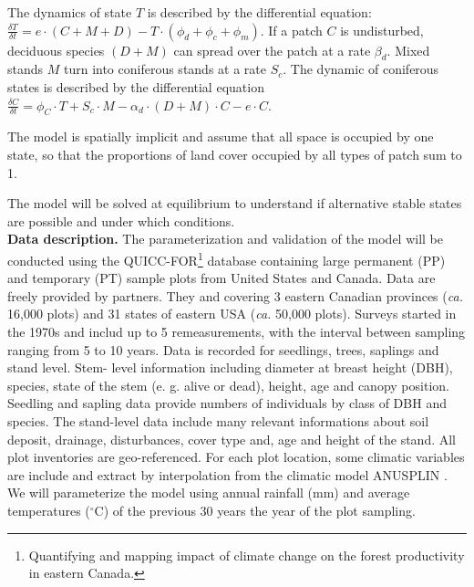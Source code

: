 The dynamics of state $T$ is described by the differential equation:
$\frac{\delta T}{\delta t} = e \cdot (C+M+D) - T \cdot (\phi_d + \phi_c +
\phi_m)$. If a patch $C$ is undisturbed, deciduous species $(D+M)$ can spread
over the patch at a rate $\beta_d$. Mixed stands $M$ turn into coniferous
stands at a rate $S_c$.  The dynamic of coniferous states is described by the
differential equation $\frac{\delta C}{\delta t} = \phi_C \cdot T + S_c \cdot
M - \alpha_d \cdot (D+M)\cdot C - e \cdot C$. 


The model is spatially implicit and assume that all space is occupied by one
state, so that the proportions of land cover occupied by all types of patch
sum to 1. 


The model will be solved at equilibrium to understand if alternative
stable states are possible and under which conditions.\\


\textbf{Data description.} The parameterization and validation of the model
will be conducted using the QUICC-FOR\footnote{Quantifying and mapping impact
of climate change on the forest productivity in eastern Canada.} database
containing large permanent (PP) and temporary (PT) sample plots from
United States and Canada. Data are freely provided by partners. They and
covering 3 eastern Canadian provinces (\textit{ca.} 16,000 plots) and 31 states of
eastern USA (\textit{ca.} 50,000 plots). Surveys started in the 1970s and includ up to
5 remeasurements, with the interval between sampling ranging from 5 to 10
years. Data is recorded for seedlings, trees, saplings and stand level. Stem-
level information including diameter at breast height (DBH), species, state of
the stem (e. g. alive or dead), height, age and canopy position. Seedling and
sapling data provide numbers of individuals by class of DBH and species. The
stand-level data include many relevant informations about soil deposit,
drainage, disturbances, cover type and, age and height of the stand. All plot
inventories are geo-referenced. For each plot location, some climatic
variables are include and extract by interpolation from the climatic model
ANUSPLIN \cite{McKenney2011}. We will parameterize the model using annual
rainfall (mm) and average temperatures (\ensuremath{^\circ}C) of the previous
30 years the year of the plot sampling. 


